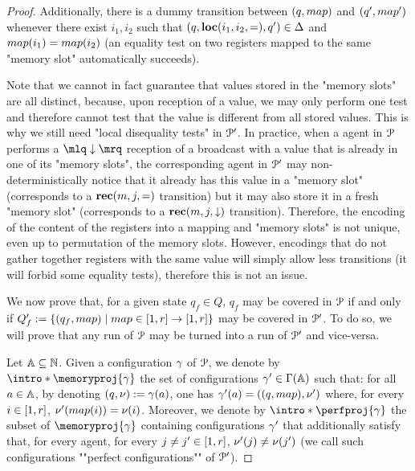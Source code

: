 \begin{proof}
	Additionally, there is a dummy transition between $(q,\map)$ and $(q',\map')$ whenever there exist $i_1, i_2$ such that $(q, \textbf{loc}(i_1,i_2,{=}), q') \in \Delta$ and $\map(i_1) = \map(i_2)$ (an equality test on two registers mapped to the same "memory slot" automatically succeeds).

	Note that we cannot in fact guarantee that values stored in the "memory slots" are all distinct, because, upon reception of a value, we may only perform one test and therefore cannot test that the value is different from all stored values. This is why we still need "local disequality tests" in $\mathcal{P}'$. In practice, when a agent in $\mathcal{P}$ performs a $\quotemarks{\enregact}$ reception of a broadcast with a value that is already in one of its "memory slots", the corresponding agent in $\mathcal{P}'$ may non-deterministically notice that it already has this value in a "memory slot" (corresponds to a $\textbf{rec}(m, j, {=})$ transition) but it may also store it in a fresh "memory slot" (corresponds to a $\textbf{rec}(m, j, \downarrow)$ transition). Therefore, the encoding of the content of the registers into a mapping and "memory slots" is not unique, even up to permutation of the memory slots. However, encodings that do not gather together registers with the same value will simply allow less transitions (it will forbid some equality tests), therefore this is not an issue. 

	We now prove that, for a given state $q_f \in Q$, $q_f$ may be covered in $\mathcal{P}$ if and only if $Q_f' := \set{(q_f, \map) \mid \map \in \nset{1}{r} \to \nset{1}{r}}$ may be covered in $\mathcal{P}'$. To do so, we will prove that any run of $\mathcal{P}$ may be turned into a run of $\mathcal{P}'$ and vice-versa. 
  
	Let $\mathbb{A} \subseteq \mathbb{N}$.
	Given a configuration $\gamma$ of $\mathcal{P}$, we denote by \AP $\intro*\memoryproj{\config}$ 
	the set of configurations $\gamma' \in \Gamma(\mathbb{A})$ such that:
	 for all $a \in \mathbb{A}$, by denoting $(q, \nu):= \gamma(a)$, one has $\config'(a) = ((q, \map), \localdata')$ where, for every $i \in [1,r]$, $\localdata'(\map(i)) = \localdata(i)$. 
	Moreover, we denote by $\intro*\perfproj{\config}$ 
	the subset of $\memoryproj{\config}$ containing configurations 
	$\gamma'$ that additionally satisfy that, for every agent, for every $j \ne j' \in [1,r]$, $\nu'(j) \ne \nu(j')$ (we call such configurations ""perfect configurations"" of $\mathcal{P}'$).


\end{proof}
